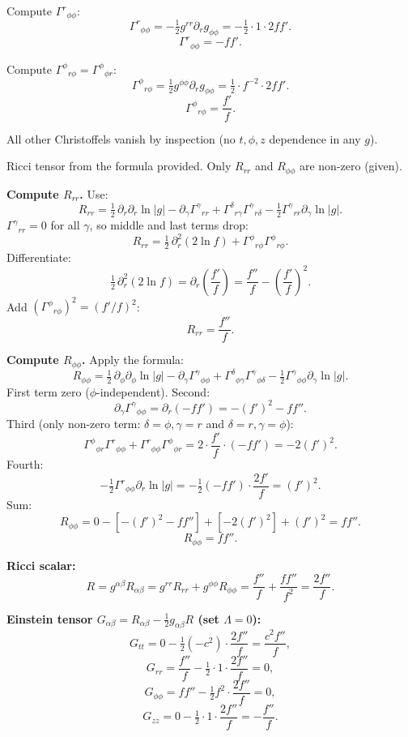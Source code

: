 \documentclass[11pt]{article}
\begin{document}
Compute $\Gamma^{r}{}_{\phi\phi}$:
\[
\Gamma^{r}{}_{\phi\phi} = -\tfrac12 g^{rr}\partial_r g_{\phi\phi} = -\tfrac12\cdot 1\cdot 2 f f'.
\]
\[
\Gamma^{r}{}_{\phi\phi} = -f f'.
\]

Compute $\Gamma^{\phi}{}_{r\phi}=\Gamma^{\phi}{}_{\phi r}$:
\[
\Gamma^{\phi}{}_{r\phi} = \tfrac12 g^{\phi\phi}\partial_r g_{\phi\phi} = \tfrac12\cdot f^{-2}\cdot 2 f f'.
\]
\[
\Gamma^{\phi}{}_{r\phi} = \frac{f'}{f}.
\]

All other Christoffels vanish by inspection (no $t,\phi,z$ dependence in any $g$).

Ricci tensor from the formula provided. Only $R_{rr}$ and $R_{\phi\phi}$ are non-zero (given).

\textbf{Compute $R_{rr}$.} Use:
\[
R_{rr} = \tfrac12\,\partial_r\partial_r\ln|g| - \partial_\gamma\Gamma^{\gamma}{}_{rr} + \Gamma^{\delta}{}_{r\gamma}\Gamma^{\gamma}{}_{r\delta} - \tfrac12\Gamma^{\gamma}{}_{rr}\partial_\gamma\ln|g|.
\]
$\Gamma^{\gamma}{}_{rr}=0$ for all $\gamma$, so middle and last terms drop:
\[
R_{rr} = \tfrac12\,\partial_r^2(2\ln f) + \Gamma^{\phi}{}_{r\phi}\Gamma^{\phi}{}_{r\phi}.
\]
Differentiate:
\[
\tfrac12\,\partial_r^2(2\ln f) = \partial_r\!\left(\frac{f'}{f}\right) = \frac{f''}{f} - \left(\frac{f'}{f}\right)^2.
\]
Add $(\Gamma^{\phi}{}_{r\phi})^2 = (f'/f)^2$:
\[
\boxed{\;R_{rr} = \frac{f''}{f}.\;}
\label{eq:Rrr}
\]

\textbf{Compute $R_{\phi\phi}$.} Apply the formula:
\[
R_{\phi\phi} = \tfrac12\,\partial_\phi\partial_\phi\ln|g| - \partial_\gamma\Gamma^{\gamma}{}_{\phi\phi} + \Gamma^{\delta}{}_{\phi\gamma}\Gamma^{\gamma}{}_{\phi\delta} - \tfrac12\Gamma^{\gamma}{}_{\phi\phi}\partial_\gamma\ln|g|.
\]
First term zero ($\phi$-independent). Second:
\[
\partial_\gamma\Gamma^{\gamma}{}_{\phi\phi} = \partial_r(-f f') = -(f')^2 - f f''.
\]
Third (only non-zero term: $\delta=\phi,\gamma=r$ and $\delta=r,\gamma=\phi$):
\[
\Gamma^{\phi}{}_{\phi r}\Gamma^{r}{}_{\phi\phi} + \Gamma^{r}{}_{\phi\phi}\Gamma^{\phi}{}_{\phi r} = 2\cdot\frac{f'}{f}\cdot(-f f') = -2(f')^2.
\]
Fourth:
\[
-\tfrac12\Gamma^{r}{}_{\phi\phi}\partial_r\ln|g| = -\tfrac12(-f f')\cdot\frac{2 f'}{f} = (f')^2.
\]
Sum:
\[
R_{\phi\phi} = 0 - [-(f')^2 - f f''] + [-2(f')^2] + (f')^2 = f f''.
\]
\[
\boxed{\;R_{\phi\phi} = f f''.\;}
\label{eq:Rphiphi}
\]

\textbf{Ricci scalar:}
\[
R = g^{\alpha\beta}R_{\alpha\beta} = g^{rr}R_{rr} + g^{\phi\phi}R_{\phi\phi} = \frac{f''}{f} + \frac{f f''}{f^2} = \frac{2 f''}{f}.
\]

\textbf{Einstein tensor $G_{\alpha\beta} = R_{\alpha\beta} - \tfrac12 g_{\alpha\beta}R$ (set $\Lambda=0$):}
\[
G_{tt} = 0 - \tfrac12(-c^2)\cdot\frac{2f''}{f} = \frac{c^2 f''}{f},
\]
\[
G_{rr} = \frac{f''}{f} - \tfrac12\cdot 1\cdot\frac{2f''}{f} = 0,
\]
\[
G_{\phi\phi} = f f'' - \tfrac12 f^2\cdot\frac{2f''}{f} = 0,
\]
\[
G_{zz} = 0 - \tfrac12\cdot 1\cdot\frac{2 f''}{f} = -\frac{f''}{f}.
\]
\end{document}
